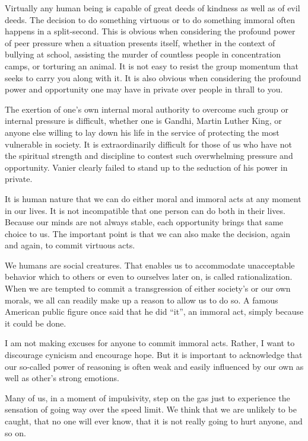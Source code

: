\documentclass[]{book}
\begin{document}
Virtually any human being is capable of great deeds of kindness as well as of evil deeds. The decision to do something virtuous or to do something immoral often happens in a split-second. This is obvious when considering the profound power of peer pressure when a situation presents itself, whether in the context of bullying at school, assisting the murder of countless people in concentration camps, or torturing an animal. It is not easy to resist the group momentum that seeks to carry you along with it. It is also obvious when considering the profound power and opportunity one may have in private over people in thrall to you.

The exertion of one's own internal moral authority to overcome such group or internal pressure is difficult, whether one is Gandhi, Martin Luther King, or anyone else willing to lay down his life in the service of protecting the most vulnerable in society. It is extraordinarily difficult for those of us who have not the spiritual strength and discipline to contest such overwhelming pressure and opportunity. Vanier clearly failed to stand up to the seduction of his power in private.

It is human nature that we can do either moral and immoral acts at any moment in our lives. It is not incompatible that one person can do both in their lives. Because our minds are not always stable, each opportunity brings that same choice to us. The important point is that we can also make the decision, again and again, to commit virtuous acts.

We humans are social creatures. That enables us to accommodate unacceptable behavior which to others or even to ourselves later on, is called rationalization. When we are tempted to commit a transgression of either society's or our own morals, we all can readily make up a reason to allow us to do so. A famous American public figure once said that he did ``it'', an immoral act, simply because it could be done.

I am not making excuses for anyone to commit immoral acts. Rather, I want to discourage cynicism and encourage hope. But it is important to acknowledge that our so-called power of reasoning is often weak and easily influenced by our own as well as other's strong emotions.

Many of us, in a moment of impulsivity, step on the gas just to experience the sensation of going way over the speed limit. We think that we are unlikely to be caught, that no one will ever know, that it is not really going to hurt anyone, and so on.
\end{document}
